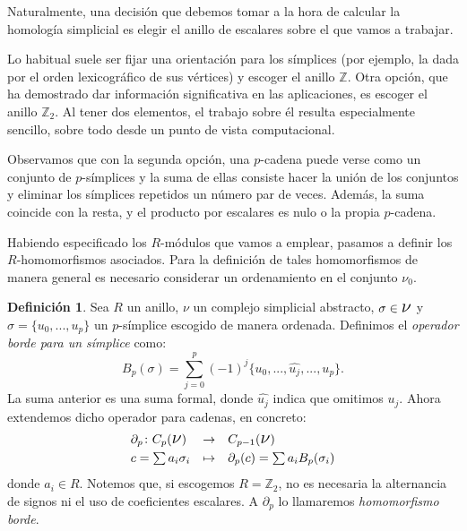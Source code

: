 \documentclass[12pt, a4paper, twoside]{book}
\numberwithin{equation}{section}
\theoremstyle{definition}
\newtheorem{defi}{Definición}[section]
\theoremstyle{remark}
\theoremstyle{plain}
\begin{document}
	Naturalmente, una decisión que debemos tomar a la hora de calcular la 
	homología simplicial es elegir el anillo de escalares sobre el que 
	vamos a trabajar. 

	Lo habitual suele ser fijar una orientación para los 
	símplices (por ejemplo, la dada por el orden lexicográfico de sus 
	vértices) y escoger el anillo $\mathbb{Z}$. Otra opción, que ha 
	demostrado dar información significativa en las aplicaciones, es 
	escoger el anillo $\mathbb{Z}_{2}$. Al tener dos elementos, el trabajo 
	sobre él resulta especialmente sencillo, sobre todo desde un punto de 
	vista computacional.

	Observamos que con la segunda opción, una $p$-cadena puede verse como
	un conjunto de $p$-símplices y la suma de ellas consiste hacer la 
	unión de los conjuntos y eliminar los símplices repetidos un número 
	par de veces. Además, la suma coincide con la resta, y el producto por 
	escalares es nulo o la propia $p$-cadena.
	
	Habiendo especificado los $R$-módulos que vamos a emplear, pasamos a
	definir los $R$-homomorfismos asociados. Para la definición de tales 
	homomorfismos de manera general es necesario considerar un 
	ordenamiento en el conjunto {\Large $\nu$}$_{0}$. 

	\begin{defi}
		Sea $R$ un anillo, {\Large $\nu$} un complejo simplicial 
		abstracto, $\sigma \in \text{{\Large $\nu$}}$ y 
		$\sigma = \{u_{0},...,u_{p}\}$ un 
		$p$-símplice escogido de manera ordenada. 
		Definimos el \textit{operador borde para un símplice}
		como:
		$$
		B_{p}(\sigma)=\displaystyle 
		\sum_{j=0}^{p}(-1)^{j}\{u_{0},...,\widehat{u_{j}},...,u_{p}\}.
		$$
 		La suma anterior es una suma formal, donde $\widehat{u_{j}}$ 
		indica que omitimos $u_{j}$. Ahora extendemos dicho operador 
		para cadenas, en concreto:
	\begin{equation}
		\label{def:borde_form}
		\begin{array}{lll}
			\partial_{p}\colon C_{p}(\text{{\Large $\nu$}}) & 
				\rightarrow & C_{p-1}(\text{{\Large $\nu$}})
				\\[3pt] 
				\multicolumn{1}{r}{c=\sum a_{i}\sigma_{i}} & 
				\mapsto & 
				\partial_{p}(c)=\sum a_{i}B_{p}(\sigma_{i})
		\end{array}
	\end{equation}
	donde $a_{i} \in R$. Notemos que, si escogemos $R=\mathbb{Z}_{2}$, no 
	es necesaria la alternancia de signos ni el uso de coeficientes 
	escalares. A $\partial_{p}$ lo llamaremos \textit{homomorfismo borde}.	
	\end{defi}
\end{document}
